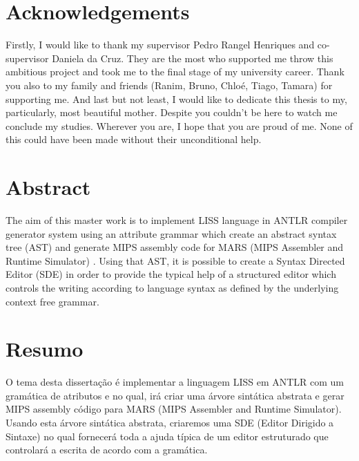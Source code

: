\documentclass[
  oneside,
  11pt, a4paper,
  footinclude=true,
  headinclude=true,
  cleardoublepage=empty
]{scrbook}
\author{Damien da Silva Vaz}
\date{\myear} %
\begin{document}
	\umfrontcover	
	\umtitlepage
	
	\chapter*{Acknowledgements}
	Firstly, I would like to thank my supervisor Pedro Rangel Henriques and co-supervisor Daniela da Cruz. They are the most who supported me throw this ambitious project and took me to the final stage of my university career.\newline
Thank you also to my family and friends (Ranim, Bruno, Chloé, Tiago, Tamara) for supporting me.\newline
And last but not least, I would like to dedicate this thesis to my, particularly, most beautiful mother.
Despite you couldn't be here to watch me conclude my studies. Wherever you are, I hope that you are proud of me.	
None of this could have been made without their unconditional help.

	\chapter*{Abstract}
	The aim of this master work is to implement LISS language in ANTLR compiler generator system using an attribute grammar which create an abstract syntax tree (AST) and generate MIPS assembly code for MARS (MIPS Assembler and Runtime Simulator) .
Using that AST, it is possible to create a Syntax Directed Editor (SDE) in order to provide the typical help of a structured editor which controls the writing according to language syntax as defined by the underlying context free grammar.
	
	\cleardoublepage
	\chapter*{Resumo}
	O tema desta dissertação é implementar a linguagem LISS em ANTLR com um gramática de atributos e no qual, irá criar uma árvore sintática abstrata e gerar MIPS assembly código para MARS (MIPS Assembler and Runtime Simulator).
        Usando esta árvore sintática abstrata, criaremos uma SDE (Editor Dirigido a Sintaxe) no qual fornecerá toda a ajuda típica de um editor estruturado que controlará a escrita de acordo com a gramática.	
	
	\tableofcontents
	\listoffigures
	\listoftables
	\printglossary[type=\acronymtype]
	\clearpage
	\thispagestyle{empty}
\end{document}
